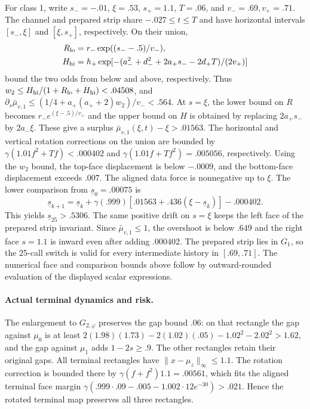 For class 1, write $s_-=-.01$, $\xi=.53$, $s_+=1.1$,
$T=.06$, and $v_-=.69,v_+=.71$.
The channel and prepared strip share $-.027\le t\le T$ and have
horizontal intervals $[s_-,\xi]$ and $[\xi,s_+]$, respectively.
On their union,
\begin{align*}
 R_{\rm lo}&=r_-\exp((s_--.5)/v_-),\\
 H_{\rm hi}&=h_+\exp[-(a_-^2+d_-^2+2a_+s_--2d_+T)/(2v_+)]
\end{align*}
bound the two odds from below and above, respectively. Thus
$w_2\le H_{\rm hi}/(1+R_{\rm lo}+H_{\rm hi})<.04508$,
and $\partial_s\bar\mu_{v,1}\le(1/4+a_+(a_++2)w_2)/v_-<.564$.
At $s=\xi$, the lower bound on $R$ becomes
$r_-e^{(\xi-.5)/v_+}$ and the upper bound on $H$ is obtained
by replacing $2a_+s_-$ by $2a_-\xi$. These give a surplus
$\bar\mu_{v,1}(\xi,t)-\xi>.01563$.
The horizontal and vertical rotation corrections on the union
are bounded by $\gamma(1.01 f^2+Tf)<.000402$ and
$\gamma(1.01f+Tf^2)=.005056$, respectively.
Using the $w_2$ bound, the top-face displacement is below
$-.0009$, and the bottom-face displacement exceeds $.007$.
The aligned data force is nonnegative up to $\xi$.
The lower comparison from $\underline s_0=.00075$ is
\[
 \underline s_{k+1}
 =\underline s_k+\gamma(.999)
       [.01563+.436(\xi-\underline s_k)]-.000402 .
\]
This yields $\underline s_{25}>.5306$. The same positive drift
on $s=\xi$ keeps the left face of the prepared strip invariant.
Since $\bar\mu_{v,1}\le1$, the overshoot is below $.649$ and
the right face $s=1.1$ is inward even after adding $.000402$.
The prepared strip lies in $G_1$, so the 25-call switch is valid
for every intermediate history in $[.69,.71]$.
The numerical face and comparison bounds above follow by
outward-rounded evaluation of the displayed scalar expressions.

\paragraph{Actual terminal dynamics and risk.}
The enlargement to $G_{2,\varphi}$ preserves the gap bound $.06$:
on that rectangle the gap against $\mu_0$ is at least
$2(1.98)(1.73)-2(1.02)(.05)-1.02^2-2.02^2>1.62$,
and the gap against $\mu_1$ adds $1-2s\ge.9$.
The other rectangles retain their original gaps.
All terminal rectangles have $\|x-\mu_z\|_\infty\le1.1$.
The rotation correction is bounded there by
$\gamma(f+f^2)1.1=.00561$, which fits the aligned terminal
face margin $\gamma(.999\cdot.09-.005-1.002\cdot12e^{-30})>.021$.
Hence the rotated terminal map preserves all three rectangles.

